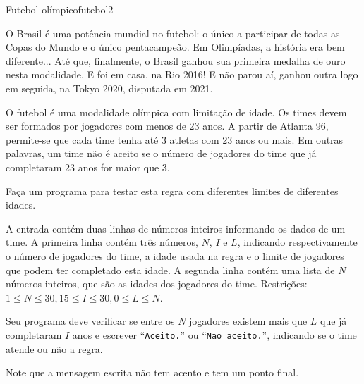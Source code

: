 \documentclass[12pt,a4paper,oneside]{article}
\begin{document}
\begin{problem}{Futebol olímpico}{futebol}{2}
 
O Brasil é uma potência mundial no futebol: o único a participar de todas as Copas do Mundo e o único pentacampeão. Em Olimpíadas, a história era bem diferente... Até que, finalmente, o Brasil ganhou sua primeira medalha de ouro nesta modalidade. E foi em casa, na Rio 2016! E não parou aí, ganhou outra logo em seguida, na Tokyo 2020, disputada em 2021.

O futebol é uma modalidade olímpica com limitação de idade. Os times devem ser formados por jogadores com menos de 23 anos. A partir de Atlanta 96, permite-se que cada time tenha até 3 atletas com 23 anos ou mais. Em outras palavras, um time não é aceito se o número de jogadores do time que já completaram 23 anos for maior que 3.

Faça um programa para testar esta regra com diferentes limites de diferentes idades.
%

\InputFile

A entrada contém duas linhas de números inteiros informando os dados de um time. A primeira linha contém três números, $N$, $I$ e $L$, indicando respectivamente o número de jogadores do time, a idade usada na regra e o limite de jogadores que podem ter completado esta idade. A segunda linha contém uma lista de $N$ números inteiros, que são as idades dos jogadores do time. Restrições: $1 \leq N \leq 30, 15 \leq I \leq 30, 0 \leq L \leq N$.


\OutputFile

Seu programa deve verificar se entre os $N$ jogadores existem mais que $L$ %
que já completaram $I$ anos %
e
escrever ``\texttt{Aceito.}'' ou ``\texttt{Nao aceito.}'', indicando se o time atende ou não a regra.

\Notes
Note que a mensagem escrita não tem acento e tem um ponto final.

\Example

\begin{example}
%
\end{example}

\begin{example}
%
\end{example}

\begin{example}
%
\end{example}


\end{problem}
\end{document}
